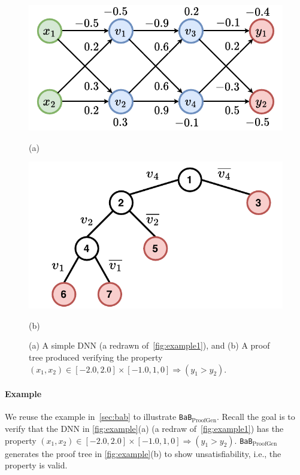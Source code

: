 \documentclass[oneside,11pt,dvipsnames]{book}
\numberwithin{equation}{section}
\theoremstyle{definition}
\theoremstyle{remark}
\newcommand{\proofgen}{\texttt{BaB$_{\text{ProofGen}}$}}
\newcommand{\neuralsat}{\texttt{NeuralSAT}}
\begin{document}
\begin{figure}[t]
    \begin{minipage}[b]{\linewidth}
        \centering
        \begin{minipage}[t]{0.48\textwidth}
            \centering  
            \includegraphics[width=\linewidth]{figure/proof_net.pdf}
            \caption*{(a)}
        \end{minipage}
        \begin{minipage}[t]{0.48\textwidth}
            \centering
            \includegraphics[width=\linewidth]{figure/proof_tree.pdf}
            \caption*{(b)}
        \end{minipage}
        \caption{(a) A simple DNN  (a redrawn of~\autoref{fig:example1}), and (b) A proof tree produced verifying the property $(x_1, x_2) \in [-2.0, 2.0] \times [-1.0, 1,0] \Rightarrow (y_1 > y_2)$.}
        \label{fig:example}
    \end{minipage}
\end{figure}

\paragraph{Example} We reuse the example in~\autoref{sec:bab} to illustrate \proofgen{}. Recall the goal is to verify that the DNN in \autoref{fig:example}(a) (a redraw of~\autoref{fig:example1}) has the property $(x_1, x_2) \in [-2.0, 2.0] \times [-1.0, 1,0] \Rightarrow (y_1 > y_2)$. \proofgen{} generates the proof tree in \autoref{fig:example}(b) to show unsatisfiability, i.e., the property is valid.
\end{document}
